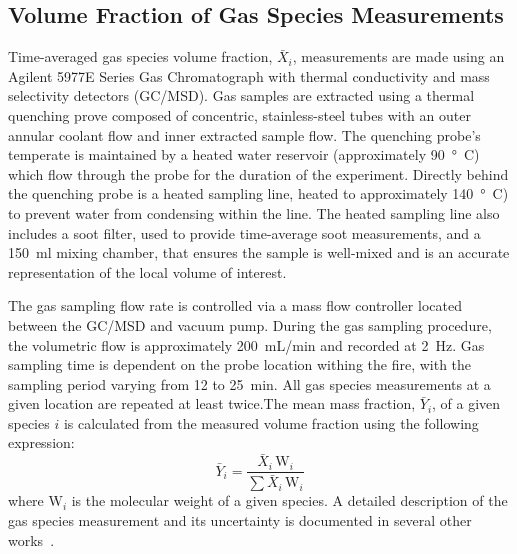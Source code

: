 \documentclass[12pt]{ussci}
\begin{document}
\subsection{Volume Fraction of Gas Species Measurements}
Time-averaged gas species volume fraction, $\bar{X}_{i}$, measurements are made using an Agilent 5977E Series Gas Chromatograph with thermal conductivity and mass selectivity detectors (GC/MSD). Gas samples are extracted using a thermal quenching prove composed of concentric, stainless-steel tubes with an outer annular coolant flow and inner extracted sample flow. The quenching probe's temperate is maintained by a heated water reservoir (approximately \SI{90}{\degree C}) which flow through the probe for the duration of the experiment. Directly behind the quenching probe is a heated sampling line, heated to approximately \SI{140}{\degree C}) to prevent water from condensing within the line. The heated sampling line also includes a soot filter, used to provide time-average soot measurements, and a 150~ml mixing chamber, that ensures the sample is well-mixed and is an accurate representation of the local volume of interest.

The gas sampling flow rate is controlled via a mass flow controller located between the GC/MSD and vacuum pump. During the gas sampling procedure, the volumetric flow is approximately 200~mL/min and recorded at 2~Hz. Gas sampling time is dependent on the probe location withing the fire, with the sampling period varying from 12 to 25~min. All gas species measurements at a given location are repeated at least twice.The mean mass fraction, $\bar{Y}_{i}$, of a given species $i$ is calculated from the measured volume fraction using the following expression:
\begin{equation}\label{eq:mass_fraction}
	\bar{Y}_{i}=\frac{\bar{X}_{i} \, {\textrm{W}_{i}}}{\sum{\bar{X}_{i} \, {\textrm{W}_{i}}}}
\end{equation}
where ${{\textrm{W}_{i}}}$ is the molecular weight of a given species. A detailed description of the gas species measurement and its uncertainty is documented in several other works~\cite{}. 
\end{document}
